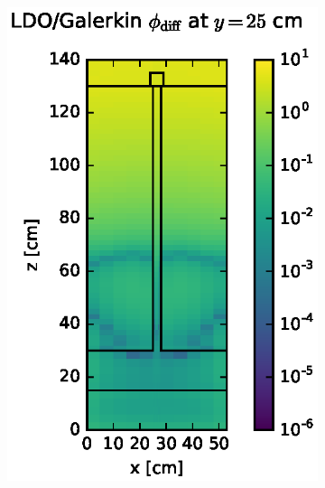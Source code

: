 \documentclass{article} %
\begin{document}
\begin{figure}[!htb]
\begin{subfigure}{0.4\textwidth}
\includegraphics[max height=0.445\textheight]
{img/steel-flux-diff-gkn.eps}
\end{subfigure}
\\
\begin{subfigure}{0.4\textwidth}

\end{subfigure}
\end{figure}
\end{document}
